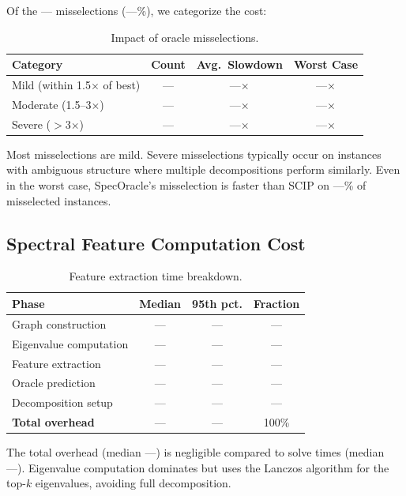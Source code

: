 \documentclass[11pt]{article}
\begin{document}
Of the --- misselections (---\%), we categorize the cost:

\begin{table}[t]
\centering
\caption{Impact of oracle misselections.}
\begin{tabular}{lccc}
\toprule
\textbf{Category} & \textbf{Count} & \textbf{Avg.\ Slowdown} & \textbf{Worst Case} \\
\midrule
Mild (within 1.5$\times$ of best) & --- & ---$\times$ & ---$\times$ \\
Moderate (1.5--3$\times$) & --- & ---$\times$ & ---$\times$ \\
Severe ($>$3$\times$) & --- & ---$\times$ & ---$\times$ \\
\bottomrule
\end{tabular}
\end{table}

Most misselections are mild. Severe misselections typically occur on instances with ambiguous structure where multiple decompositions perform similarly. Even in the worst case, SpecOracle's misselection is faster than SCIP on ---\% of misselected instances.

\subsection{Spectral Feature Computation Cost}

\begin{table}[t]
\centering
\caption{Feature extraction time breakdown.}
\begin{tabular}{lccc}
\toprule
\textbf{Phase} & \textbf{Median} & \textbf{95th pct.} & \textbf{Fraction} \\
\midrule
Graph construction & --- & --- & --- \\
Eigenvalue computation & --- & --- & --- \\
Feature extraction & --- & --- & --- \\
Oracle prediction & --- & --- & --- \\
Decomposition setup & --- & --- & --- \\
\midrule
\textbf{Total overhead} & --- & --- & 100\% \\
\bottomrule
\end{tabular}
\end{table}

The total overhead (median ---) is negligible compared to solve times (median ---). Eigenvalue computation dominates but uses the Lanczos algorithm for the top-$k$ eigenvalues, avoiding full decomposition.
\end{document}

